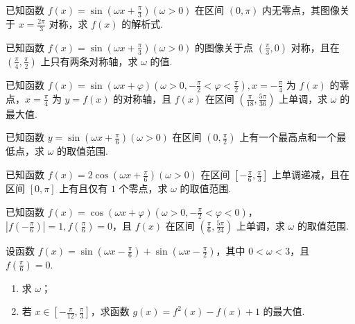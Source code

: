 \documentclass[a4paper , final]{ctexart}
\newenvironment{problem}[1]{%
  \item #1
  \par
  \vspace{8cm}
}{}
\begin{document}
\begin{problems}
  \begin{problem}
  {
  已知函数 $f(x) = \sin(\omega x +\frac{\pi}{3})(\omega > 0)$ 在区间 $(0,\pi)$ 内无零点，其图像关于 $x=\frac{2\pi}{3}$ 对称，求 $f(x)$ 的解析式.
  }
  \end{problem}

  \begin{problem}
  {
  已知函数 $f(x) = \sin(\omega x +\frac{\pi}{3})(\omega > 0)$ 的图像关于点 $(\frac{\pi}{3},0)$ 对称，且在 $(\frac{\pi}{4},\frac{\pi}{2})$ 上只有两条对称轴，求 $\omega$ 的值.
  }
  \end{problem}

  \begin{problem}
  {
  已知函数 $f(x) = \sin(\omega x +\varphi)(\omega > 0,-\frac{\pi}{2}<\varphi<\frac{\pi}{2}),x=-\frac{\pi}   {4}$ 为 $f(x)$ 的零点，$x=\frac{\pi}{4}$ 为 $y=f(x)$ 的对称轴，且 $f(x)$ 在区间 $\left(\frac{\pi}  {18},\frac{5\pi}{36}\right)$ 上单调，求 $\omega$ 的最大值.
  }
  \end{problem}

  \begin{problem}
  {
  已知函数 $y = \sin(\omega x +\frac{\pi}{6})(\omega > 0)$ 在区间 $(0,\frac{\pi}{2})$ 上有一个最高点和一个最低点，求 $\omega$ 的取值范围.
  }
  \end{problem}

  \begin{problem}
  {
  已知函数 $f(x) = 2\cos(\omega x +\frac{\pi}{6})(\omega > 0)$ 在区间 $[-\frac{\pi}{6},\frac{\pi}{3}]$ 上单调递减，且在区间 $[0,\pi]$ 上有且仅有 $1$ 个零点，求 $\omega$ 的取值范围.
  }
  \end{problem}

  \begin{problem}
  {
  已知函数 $f(x) = \cos(\omega x +\varphi)(\omega > 0,-\frac{\pi}{2}<\varphi<0)$，$\left\vert f(-\frac{\pi}{6})\right\vert=1,f(\frac{\pi}{6})=0$，且 $f(x)$ 在区间 $\left(\frac{\pi}{6},\frac{5\pi}{24}\right)$ 上单调，求 $\omega$ 的取值范围.
  }
  \end{problem}

  \begin{problem}
  {
  设函数 $f(x) = \sin\left(\omega x - \frac{\pi}{6}\right) + \sin\left(\omega x - \frac{\pi}{2}\right)$，其中 $0 < \omega < 3$，且 $f\left(\frac{\pi}{6}\right) = 0$.
  \begin{enumerate}[label=(\arabic*)]
    \item 求 $\omega$；
    \item 若 $x \in \left[-\frac{\pi}{12}, \frac{\pi}{3}\right]$，求函数 $g(x) = f^2(x) - f(x) + 1$ 的最大值.
  \end{enumerate}
  }


  \end{problem}
\end{problems}
\end{document}
